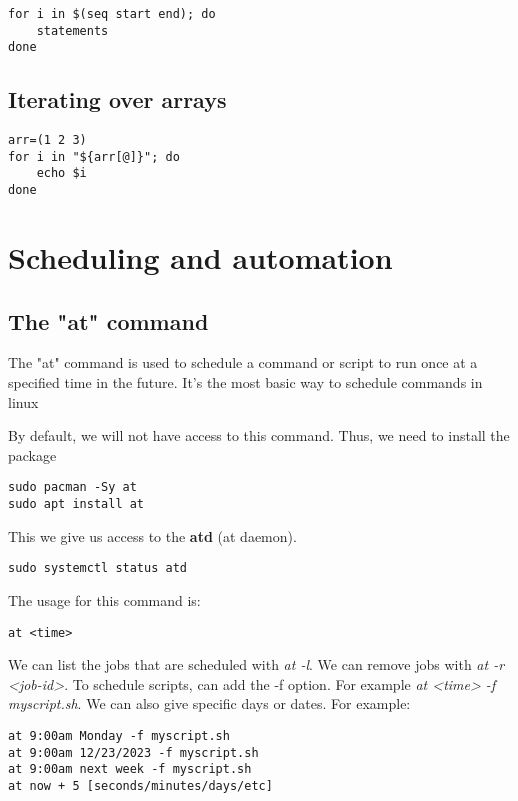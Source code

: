 \documentclass{report}
\begin{document}
    \begin{verbatim}
for i in $(seq start end); do
    statements
done
    \end{verbatim}
    \bigbreak \noindent
    

    \bigbreak \noindent 
    \subsection{Iterating over arrays}
    \smallbreak \noindent
    
    \begin{verbatim}
arr=(1 2 3)
for i in "${arr[@]}"; do
    echo $i
done
    \end{verbatim}
    \bigbreak \noindent
    

    \pagebreak \bigbreak \noindent 
    \section{\LARGE Scheduling and automation}
    \bigbreak \noindent 
    \subsection{The "at" command}
    \bigbreak \noindent 
    \begin{concept}
        The "at" command is used to schedule a command or script to run once at a specified time in the future. It's the most basic way to schedule commands in linux
    \end{concept}
    \bigbreak \noindent 
    By default, we will not have access to this command. Thus, we need to install the package
    \bigbreak \noindent 
    \begin{verbatim}
sudo pacman -Sy at
sudo apt install at
    \end{verbatim}
    \bigbreak \noindent 
    This we give us access to the \textbf{atd} (at daemon).
    \bigbreak \noindent 
    \begin{verbatim}
sudo systemctl status atd  
    \end{verbatim}
    \bigbreak \noindent 
    The usage for this command is:
    
    \begin{verbatim}
at <time>
    \end{verbatim}
    \bigbreak \noindent
    
    \bigbreak \noindent 
    We can list the jobs that are scheduled with \textit{at -l}. We can remove jobs with \textit{at -r <job-id>}. To schedule scripts, can add the -f option. For example \textit{at <time> -f myscript.sh}. 
    \bigbreak \noindent 
    We can also give specific days or dates. For example:
    \begin{verbatim}
at 9:00am Monday -f myscript.sh
at 9:00am 12/23/2023 -f myscript.sh
at 9:00am next week -f myscript.sh
at now + 5 [seconds/minutes/days/etc]
    \end{verbatim}
    \bigbreak \noindent
    
\end{document}
